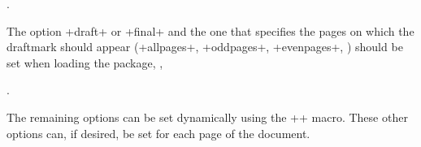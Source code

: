 \documentclass[a4paper,10pt,final]{article}
\begin{document}
\begin{dmverbatim}
\usepackage[draft,allpages=true,fontfamily=pag,color=gray,grayness=0.8,
  mark=DRAFT,angle=45,scale=0.8,xcoord=0,ycoord=0]{draftmark}

\usepackage[draft,pages=1-4,fontfamily=phv,color=red!55!yellow!50,
  mark=CONFIDENTIAL,angle=55,scale=0.8,xcoord=20,ycoord=10]{draftmark}.
\end{dmverbatim}

The option +draft+ or +final+ and the one that specifies the pages on which the draftmark should appear (+allpages+, +oddpages+, +evenpages+, \etc) should be set when loading the package, \eg,

\begin{dmverbatim}
\usepackage[draft,evenpages]{draftmark}.
\end{dmverbatim}

The remaining options can be set dynamically using the +\draftmarksetup+ macro. These other options can, if desired, be set for each page of the document.


\newpage
\lipsum[1-4]

\newpage
\lipsum[1-4]

\newpage
\lipsum[1-4]
\end{document}

